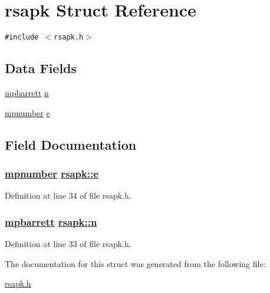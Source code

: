 \hypertarget{structrsapk}{
\section{rsapk Struct Reference}
\label{structrsapk}
}
{\tt \#include $<$rsapk.h$>$}

\subsection*{Data Fields}
\begin{CompactItemize}
\item 
\hyperlink{structmpbarrett}{mpbarrett} \hyperlink{structrsapk_o0}{n}
\item 
\hyperlink{structmpnumber}{mpnumber} \hyperlink{structrsapk_o1}{e}
\end{CompactItemize}


\subsection{Field Documentation}
\hypertarget{structrsapk_o1}{
\subsubsection[e]{\setlength{\rightskip}{0pt plus 5cm}\hyperlink{structmpnumber}{mpnumber} \hyperlink{structrsapk_o1}{rsapk::e}}}
\label{structrsapk_o1}


Definition at line 34 of file rsapk.h.\hypertarget{structrsapk_o0}{
\subsubsection[n]{\setlength{\rightskip}{0pt plus 5cm}\hyperlink{structmpbarrett}{mpbarrett} \hyperlink{structrsapk_o0}{rsapk::n}}}
\label{structrsapk_o0}


Definition at line 33 of file rsapk.h.

The documentation for this struct was generated from the following file:\begin{CompactItemize}
\item 
\hyperlink{rsapk_8h}{rsapk.h}\end{CompactItemize}

